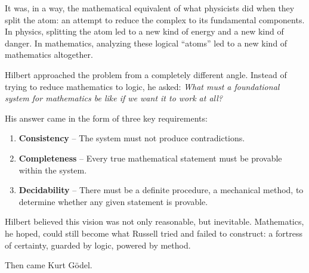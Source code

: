 It was, in a way, the mathematical equivalent of what physicists did when they split the atom: an attempt to reduce the complex to its fundamental components. In physics, splitting the atom led to a new kind of energy and a new kind of danger. In mathematics, analyzing these logical ``atoms'' led to a new kind of mathematics altogether.

Hilbert approached the problem from a completely different angle. Instead of trying to reduce mathematics to logic, he asked: \textit{What must a foundational system for mathematics be like if we want it to work at all?}

His answer came in the form of three key requirements:

\begin{enumerate}
    \item \textbf{Consistency} – The system must not produce contradictions.
    \item \textbf{Completeness} – Every true mathematical statement must be provable within the system.
    \item \textbf{Decidability} – There must be a definite procedure, a mechanical method, to determine whether any given statement is provable.
\end{enumerate}

Hilbert believed this vision was not only reasonable, but inevitable. Mathematics, he hoped, could still become what Russell tried and failed to construct: a fortress of certainty, guarded by logic, powered by method.

Then came Kurt Gödel.